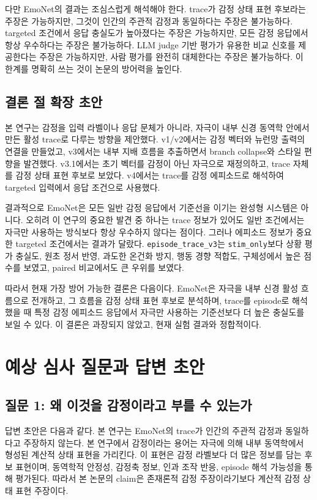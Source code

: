 \documentclass[11pt,a4paper]{article}
\newcommand{\eng}[1]{\texttt{#1}}
\begin{document}
다만 EmoNet의 결과는 조심스럽게 해석해야 한다. trace가 감정 상태 표현 후보라는 주장은 가능하지만, 그것이 인간의 주관적 감정과 동일하다는 주장은 불가능하다. targeted 조건에서 응답 충실도가 높아졌다는 주장은 가능하지만, 모든 감정 응답에서 항상 우수하다는 주장은 불가능하다. LLM judge 기반 평가가 유용한 비교 신호를 제공한다는 주장은 가능하지만, 사람 평가를 완전히 대체한다는 주장은 불가능하다. 이 한계를 명확히 쓰는 것이 논문의 방어력을 높인다.

\subsection{결론 절 확장 초안}

본 연구는 감정을 입력 라벨이나 응답 문체가 아니라, 자극이 내부 신경 동역학 안에서 만든 활성 trace로 다루는 방향을 제안했다. v1/v2에서는 감정 벡터와 뉴런망 출력의 연결을 만들었고, v3에서는 내부 지배 흐름을 추출하면서 branch collapse와 스타일 편향을 발견했다. v3.1에서는 초기 벡터를 감정이 아닌 자극으로 재정의하고, trace 자체를 감정 상태 표현 후보로 보았다. v4에서는 trace를 감정 에피소드로 해석하여 targeted 입력에서 응답 조건으로 사용했다.

결과적으로 EmoNet은 모든 일반 감정 응답에서 기준선을 이기는 완성형 시스템은 아니다. 오히려 이 연구의 중요한 발견 중 하나는 trace 정보가 있어도 일반 조건에서는 자극만 사용하는 방식보다 항상 우수하지 않다는 점이다. 그러나 에피소드 정보가 중요한 targeted 조건에서는 결과가 달랐다. \eng{episode\_trace\_v3}는 \eng{stim\_only}보다 상황 평가 충실도, 원초 정서 반영, 과도한 온건화 방지, 행동 경향 적합도, 구체성에서 높은 점수를 보였고, paired 비교에서도 큰 우위를 보였다.

따라서 현재 가장 방어 가능한 결론은 다음이다. EmoNet은 자극을 내부 신경 활성 흐름으로 전개하고, 그 흐름을 감정 상태 표현 후보로 분석하며, trace를 episode로 해석했을 때 특정 감정 에피소드 응답에서 자극만 사용하는 기준선보다 더 높은 충실도를 보일 수 있다. 이 결론은 과장되지 않았고, 현재 실험 결과와 정합적이다.

\section{예상 심사 질문과 답변 초안}

\subsection{질문 1: 왜 이것을 감정이라고 부를 수 있는가}

답변 초안은 다음과 같다. 본 연구는 EmoNet의 trace가 인간의 주관적 감정과 동일하다고 주장하지 않는다. 본 연구에서 감정이라는 용어는 자극에 의해 내부 동역학에서 형성된 계산적 상태 표현을 가리킨다. 이 표현은 감정 라벨보다 더 많은 정보를 담는 후보 표현이며, 동역학적 안정성, 감정축 정보, 인과 조작 반응, episode 해석 가능성을 통해 평가된다. 따라서 본 논문의 claim은 존재론적 감정 주장이라기보다 계산적 감정 상태 표현 주장이다.
\end{document}
